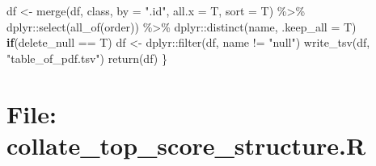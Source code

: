 \documentclass[
]{article}
\newenvironment{Shaded}{\begin{snugshade}}{\end{snugshade}}
\newcommand{\AttributeTok}[1]{\textcolor[rgb]{0.77,0.63,0.00}{#1}}
\newcommand{\ControlFlowTok}[1]{\textcolor[rgb]{0.13,0.29,0.53}{\textbf{#1}}}
\newcommand{\FunctionTok}[1]{\textcolor[rgb]{0.00,0.00,0.00}{#1}}
\newcommand{\NormalTok}[1]{#1}
\newcommand{\OtherTok}[1]{\textcolor[rgb]{0.56,0.35,0.01}{#1}}
\newcommand{\SpecialCharTok}[1]{\textcolor[rgb]{0.00,0.00,0.00}{#1}}
\newcommand{\StringTok}[1]{\textcolor[rgb]{0.31,0.60,0.02}{#1}}
\begin{document}
\begin{Shaded}
\begin{Highlighting}[]
\NormalTok{    df }\OtherTok{\textless{}{-}} \FunctionTok{merge}\NormalTok{(df, class, }\AttributeTok{by =} \StringTok{".id"}\NormalTok{, }\AttributeTok{all.x =}\NormalTok{ T, }\AttributeTok{sort =}\NormalTok{ T) }\SpecialCharTok{\%\textgreater{}\%}
\NormalTok{      dplyr}\SpecialCharTok{::}\FunctionTok{select}\NormalTok{(}\FunctionTok{all\_of}\NormalTok{(order)) }\SpecialCharTok{\%\textgreater{}\%}
\NormalTok{      dplyr}\SpecialCharTok{::}\FunctionTok{distinct}\NormalTok{(name, }\AttributeTok{.keep\_all =}\NormalTok{ T)}
    \ControlFlowTok{if}\NormalTok{(delete\_null }\SpecialCharTok{==}\NormalTok{ T)}
\NormalTok{      df }\OtherTok{\textless{}{-}}\NormalTok{ dplyr}\SpecialCharTok{::}\FunctionTok{filter}\NormalTok{(df, name }\SpecialCharTok{!=} \StringTok{"null"}\NormalTok{)}
    \FunctionTok{write\_tsv}\NormalTok{(df, }\StringTok{"table\_of\_pdf.tsv"}\NormalTok{)}
    \FunctionTok{return}\NormalTok{(df)}
\NormalTok{  \}}
\end{Highlighting}
\end{Shaded}

\hypertarget{file-collate_top_score_structure.r}{%
\section{File: collate\_top\_score\_structure.R}\label{file-collate_top_score_structure.r}}
\end{document}
